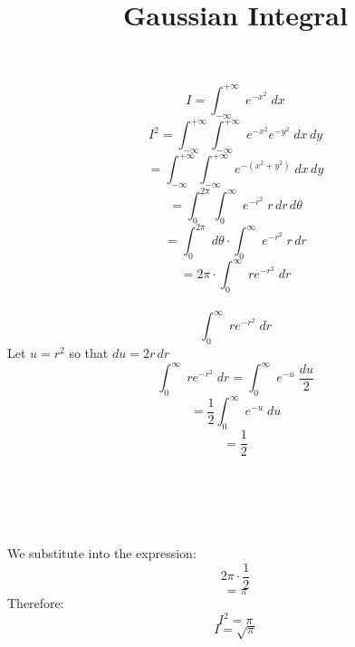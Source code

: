\documentclass{article}
\title{Gaussian Integral}
\begin{document}
\section{}
\[I=\int^{+\infty}_{-\infty} \; e^{-x^2} \; dx\]
\[I^2=\int^{+\infty}_{-\infty}\int^{+\infty}_{-\infty} \; e^{-x^2}e^{-y^2}\; dx \, dy\]
\[= \int^{+\infty}_{-\infty}\int^{+\infty}_{-\infty} \; e^{-(x^2+y^2)} \; dx \, dy\]
\[=\int_0^{2\pi}\int_0^{\infty} \; e^{-r^2} \; r \, dr \, d\theta\]
\[=\int_0^{2\pi} \; d\theta \cdot \int_0^{\infty} \; e^{-r^2} \; r \, dr\]
\[=2\pi \cdot \int_0^{\infty} \; re^{-r^2} \;  dr\]
\\
\[\int_0^{\infty} \; re^{-r^2} \; dr\]
Let $u=r^2$ so that $du=2r\,dr$
\[\int_0^{\infty} \; re^{-r^2} \; dr=\int_0^{\infty} \; e^{-u} \; \frac{du}{2}\]
\[=\frac{1}{2}\int_0^{\infty} \; e^{-u} \; du\]
\[=\frac{1}{2}\] \\
\\
\\
\\
\\

We substitute into the expression:
\[2\pi \cdot \frac{1}{2}\]
\[=\pi\]
Therefore:
\[I^2=\pi\]
\[I=\sqrt{\pi}\]
\end{document}
